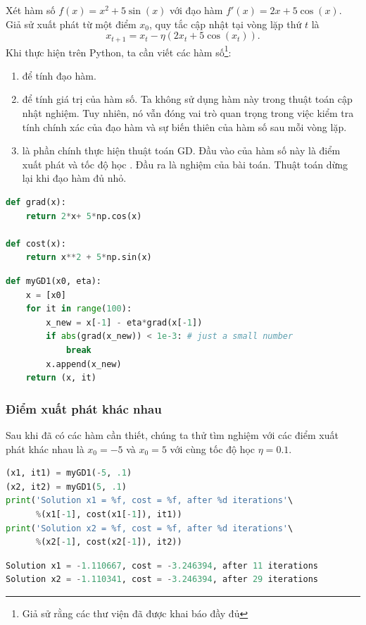 Xét hàm số $f(x) = x^2 + 5\sin(x)$ với đạo hàm $f'(x) = 2x + 5\cos(x)$. Giả sử
xuất phát từ một điểm $x_{0}$, quy tắc cập nhật tại vòng lặp thứ $t$ là
\begin{equation}
x_{t+1} = x_t - \eta(2x_t + 5\cos(x_t)).
\end{equation}
Khi thực hiện trên Python, ta cần viết các hàm số\footnote{Giả sử rằng các thư
viện đã được khai báo đầy đủ}:
\begin{enumerate}
\item {} để tính đạo hàm.

\item  {} để tính giá trị của hàm số. Ta không sử dụng hàm này trong thuật toán cập nhật nghiệm. Tuy nhiên, nó vẫn đóng vai trò quan trọng trong việc kiểm tra tính chính xác của đạo hàm và sự biến thiên của hàm số sau mỗi vòng lặp.

\item {} là phần chính thực hiện thuật toán GD. Đầu vào
của hàm số này là điểm xuất phát  và tốc độ học
. Đầu ra là nghiệm của bài toán. Thuật toán dừng lại khi
đạo hàm đủ nhỏ.
\end{enumerate}


\begin{lstlisting}[language=Python]
def grad(x):
    return 2*x+ 5*np.cos(x)

def cost(x):
    return x**2 + 5*np.sin(x)
\end{lstlisting}

\begin{lstlisting}[language=Python]
def myGD1(x0, eta):
    x = [x0]
    for it in range(100):
        x_new = x[-1] - eta*grad(x[-1])
        if abs(grad(x_new)) < 1e-3: # just a small number
            break
        x.append(x_new)
    return (x, it)
\end{lstlisting}



\subsubsection{Điểm xuất phát khác nhau}

Sau khi đã có các hàm cần thiết, chúng ta thử tìm nghiệm với các điểm xuất phát
khác nhau là $x_{0} = -5$ và $x_{0} = 5$ với cùng tốc độ học $\eta = 0.1$.

\begin{lstlisting}[language=Python]
(x1, it1) = myGD1(-5, .1)
(x2, it2) = myGD1(5, .1)
print('Solution x1 = %f, cost = %f, after %d iterations'\ 
      %(x1[-1], cost(x1[-1]), it1))
print('Solution x2 = %f, cost = %f, after %d iterations'\
      %(x2[-1], cost(x2[-1]), it2))
\end{lstlisting}
\kq
\begin{lstlisting}[language=Python]
Solution x1 = -1.110667, cost = -3.246394, after 11 iterations
Solution x2 = -1.110341, cost = -3.246394, after 29 iterations
\end{lstlisting}

